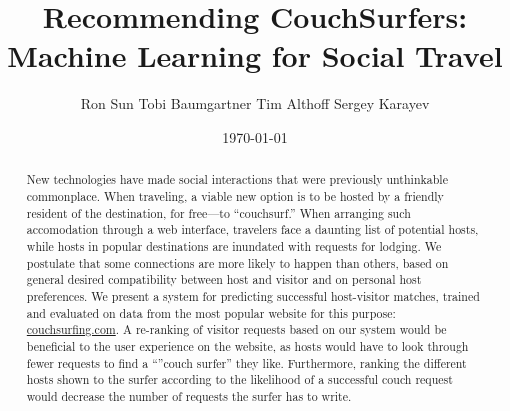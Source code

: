 \documentclass{article}
\title{Recommending CouchSurfers: Machine Learning for Social Travel}
\author{Ron Sun \And Tobi Baumgartner \And Tim Althoff \And Sergey Karayev}
\date{\today}
\begin{document}
\maketitle

\begin{abstract}
New technologies have made social interactions that were previously unthinkable commonplace.
When traveling, a viable new option is to be hosted by a friendly resident of the destination, for free---to ``couchsurf.''
When arranging such accomodation through a web interface, travelers face a daunting list of potential hosts, while hosts in popular destinations are inundated with requests for lodging.
We postulate that some connections are more likely to happen than others, based on general desired compatibility between host and visitor and on personal host preferences.
We present a system for predicting successful host-visitor matches, trained and evaluated on data from the most popular website for this purpose: \url{couchsurfing.com}.
A re-ranking of visitor requests based on our system would be beneficial to the user experience on the website, as hosts would have to look through fewer requests to find a ``''couch surfer'' they like.
Furthermore, ranking the different hosts shown to the surfer according to the likelihood of a successful couch request would decrease the number of requests the surfer has to write.
\end{abstract}










\small

\end{document}
